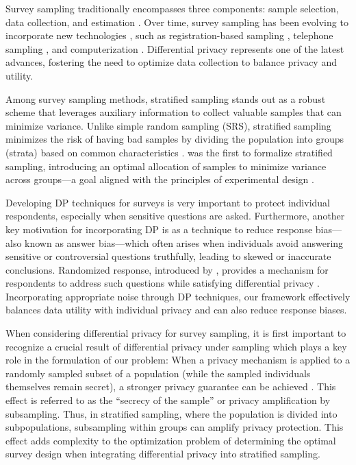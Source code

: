 \documentclass{article}
\theoremstyle{definition}
\begin{document}
Survey sampling traditionally encompasses three components: sample selection, data collection, and estimation \citep{brick2011}. Over time, survey sampling has been evolving to incorporate new technologies \citep{frankel1987fifty}, such as registration-based sampling \citep{green2006can}, telephone sampling \citep{force2010new}, and computerization \citep{baker1998computer}. Differential privacy represents one of the latest advances, fostering the need to optimize data collection to balance privacy and utility.

Among survey sampling methods, stratified sampling stands out as a robust scheme that leverages auxiliary information to collect valuable samples that can minimize variance. Unlike simple random sampling (SRS), stratified sampling minimizes the risk of having bad samples by dividing the population into groups (strata) based on common characteristics \citep{lohr2021sampling}. \citet{neyman1934two} was the first to formalize stratified sampling, introducing an optimal allocation of samples to minimize variance across groups---a goal aligned with the principles of experimental design \citep{wu2011experiments}.

Developing DP techniques for surveys is very important to protect individual respondents, especially when sensitive questions are asked. Furthermore, another key motivation for incorporating DP is as a technique to reduce response bias---also known as answer bias---which often arises when individuals avoid answering sensitive or controversial questions truthfully, leading to skewed or inaccurate conclusions. Randomized response, introduced by \citet{Stanley1965}, provides a mechanism for respondents to address such questions while satisfying differential privacy \citep{dwork2014algorithmic}. Incorporating appropriate noise through DP techniques, our framework effectively balances data utility with individual privacy and can also reduce response biases.


When considering differential privacy for survey sampling, it is first important to recognize a crucial result of differential privacy under sampling which plays a key role in the formulation of our problem: When a privacy mechanism is applied to a randomly sampled subset of a population (while the sampled individuals themselves remain secret), a stronger privacy guarantee can be achieved \citep{kasiviswanathan2011can}. This effect is referred to as the ``secrecy of the sample'' or privacy amplification by subsampling. Thus, in stratified sampling, where the population is divided into subpopulations, subsampling within groups can amplify privacy protection. This effect adds complexity to the optimization problem of determining the optimal survey design when integrating differential privacy into stratified sampling.
\end{document}
